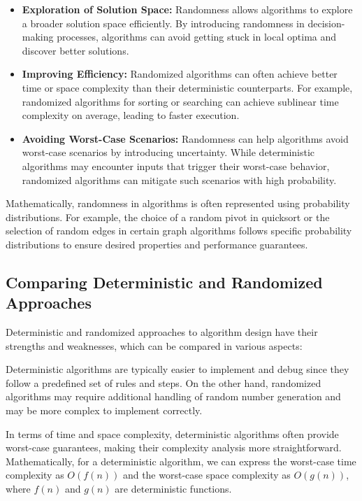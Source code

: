 \documentclass[12pt]{book} %
\begin{document}
\begin{itemize}
    \item \textbf{Exploration of Solution Space:} Randomness allows algorithms to explore a broader solution space efficiently. By introducing randomness in decision-making processes, algorithms can avoid getting stuck in local optima and discover better solutions.
    
    \item \textbf{Improving Efficiency:} Randomized algorithms can often achieve better time or space complexity than their deterministic counterparts. For example, randomized algorithms for sorting or searching can achieve sublinear time complexity on average, leading to faster execution.
    
    \item \textbf{Avoiding Worst-Case Scenarios:} Randomness can help algorithms avoid worst-case scenarios by introducing uncertainty. While deterministic algorithms may encounter inputs that trigger their worst-case behavior, randomized algorithms can mitigate such scenarios with high probability.
\end{itemize}

Mathematically, randomness in algorithms is often represented using probability distributions. For example, the choice of a random pivot in quicksort or the selection of random edges in certain graph algorithms follows specific probability distributions to ensure desired properties and performance guarantees.

\subsection{Comparing Deterministic and Randomized Approaches}
Deterministic and randomized approaches to algorithm design have their strengths and weaknesses, which can be compared in various aspects:

Deterministic algorithms are typically easier to implement and debug since they follow a predefined set of rules and steps. On the other hand, randomized algorithms may require additional handling of random number generation and may be more complex to implement correctly.

In terms of time and space complexity, deterministic algorithms often provide worst-case guarantees, making their complexity analysis more straightforward. Mathematically, for a deterministic algorithm, we can express the worst-case time complexity as \(O(f(n))\) and the worst-case space complexity as \(O(g(n))\), where \(f(n)\) and \(g(n)\) are deterministic functions.
\end{document}
